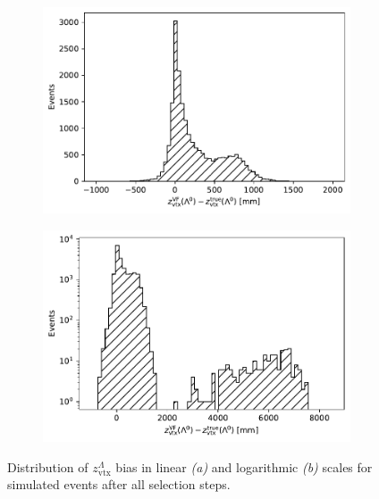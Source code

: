 
\begin{figure}[t]
	\centering
	\begin{subfigure}{.45\textwidth}
		\includegraphics[width=\textwidth]{graphics/03-vertex_reconstruction/Lambda_endvertex_bias_z.pdf}
		\caption{}
		\label{fig:3:lz_endvertex_bias_linear}
	\end{subfigure}
	\begin{subfigure}{.45\textwidth}
		\includegraphics[width=\textwidth]{graphics/03-vertex_reconstruction/Lambda_endvertex_bias_z_log.pdf}
		\caption{}
		\label{fig:3:lz_endvertex_bias_log}
	\end{subfigure}
	\caption{Distribution of $z_\text{vtx}^\Lambda$ bias in linear \textit{(a)} and logarithmic \textit{(b)} scales for simulated \demonstratorshort events after all selection steps.}
	\label{fig:3:lz_endvertex_bias}
\end{figure}

